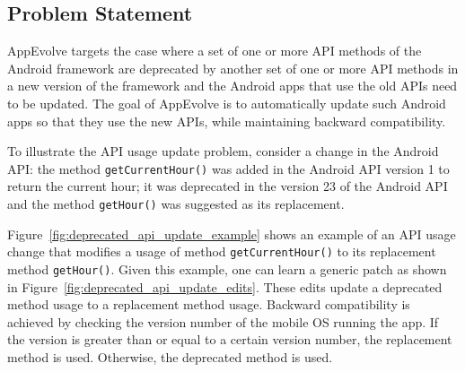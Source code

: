 
\subsection{Problem Statement}\label{sec:problem}

AppEvolve targets the case where a set of one or more API methods of
the Android framework are deprecated by another set of one or more
API methods in a new version of the framework and the Android apps that use the old APIs need to be updated.
The goal of AppEvolve is to
automatically update such Android apps so that they use
the new APIs, while maintaining backward compatibility.


To illustrate the API usage update problem, consider a change in the
Android API: the method \texttt{getCurrentHour()} was added in the Android API version 1 to return
the current hour; it was deprecated in the version 23 of the Android API and the
method \texttt{getHour()} was suggested as its replacement.

Figure~\ref{fig:deprecated_api_update_example} shows an example of an API
usage change that modifies a usage of method \texttt{getCurrentHour()} to
its replacement method \texttt{getHour()}. Given this example, one can
learn a generic patch as shown in
Figure~\ref{fig:deprecated_api_update_edits}. These edits update a
deprecated method usage to a replacement method usage.
Backward compatibility is achieved by checking the version number of the
mobile OS running the app. If the version is greater than or equal to a
certain version number, the replacement method is used. Otherwise, the
deprecated method is used.

